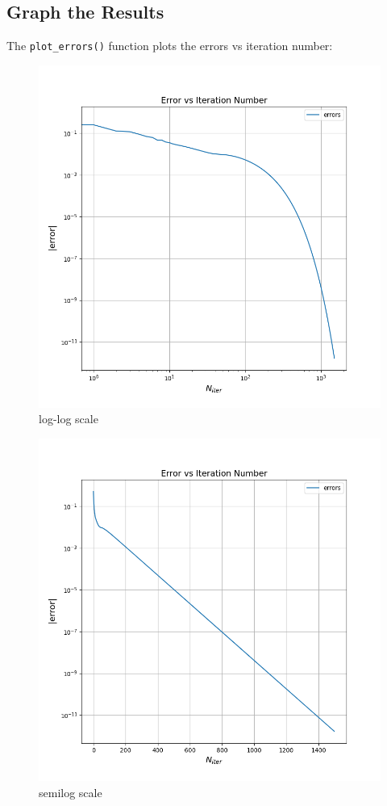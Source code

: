 \documentclass[12pt, a4paper]{article}
\newcommand{\code}{\lstinline[basicstyle=\small]}
\begin{document}
\subsection{Graph the Results}
The \code{plot_errors()} function plots the errors vs iteration number:
\begin{figure}[H]
    \centering
    \includegraphics[scale=0.4]{7a.png}
    \caption*{log-log scale}
\end{figure}
\begin{figure}[H]
    \centering
    \includegraphics[scale=0.4]{7b.png}
    \caption*{semilog scale}
\end{figure}
\pagebreak
\end{document}
